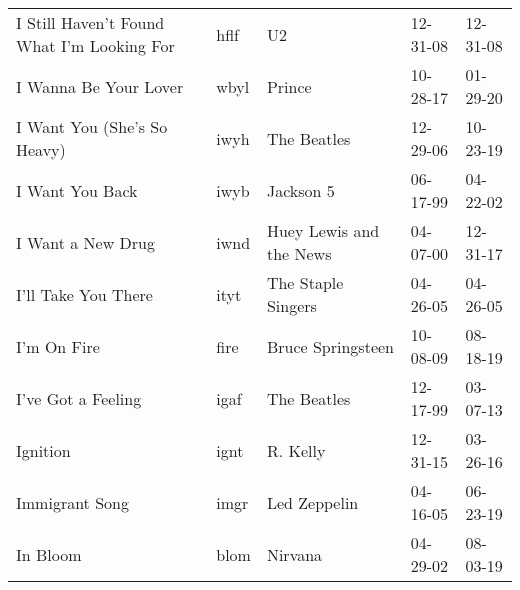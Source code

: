 \begin{longtable}{p{}p{}p{}p{}p{}}
                              I Still Haven't Found What I'm Looking For &          hflf &                                                       U2 &              12-31-08 &             12-31-08 \\
                                                   I Wanna Be Your Lover &          wbyl &                                                   Prince &              10-28-17 &             01-29-20 \\
                                             I Want You (She's So Heavy) &          iwyh &                                              The Beatles &              12-29-06 &             10-23-19 \\
                                                         I Want You Back &          iwyb &                                                Jackson 5 &              06-17-99 &             04-22-02 \\
                                                       I Want a New Drug &          iwnd &                                  Huey Lewis and the News &              04-07-00 &             12-31-17 \\
                                                     I'll Take You There &          ityt &                                       The Staple Singers &              04-26-05 &             04-26-05 \\
                                                             I'm On Fire &          fire &                                        Bruce Springsteen &              10-08-09 &             08-18-19 \\
                                                      I've Got a Feeling &          igaf &                                              The Beatles &              12-17-99 &             03-07-13 \\
                                                                Ignition &          ignt &                                                 R. Kelly &              12-31-15 &             03-26-16 \\
                                                          Immigrant Song &          imgr &                                             Led Zeppelin &              04-16-05 &             06-23-19 \\
                                                                In Bloom &          blom &                                                  Nirvana &              04-29-02 &             08-03-19 \\

\end{longtable}
